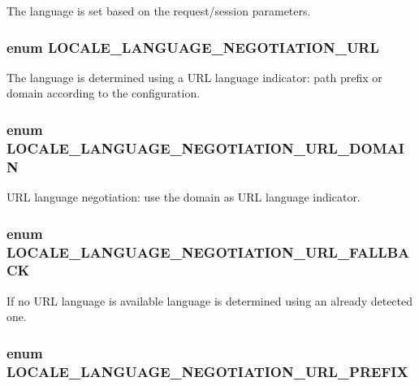 \label{locale_8inc_a332fbf28d5c861b2960b5ae1376e6b1e}
The language is set based on the request/session parameters. \hypertarget{locale_8inc_a47663841cfe2ded810a1af260d33bcef}{
\subsubsection[{LOCALE\_\-LANGUAGE\_\-NEGOTIATION\_\-URL}]{\setlength{\rightskip}{0pt plus 5cm}enum {\bf LOCALE\_\-LANGUAGE\_\-NEGOTIATION\_\-URL}}}
\label{locale_8inc_a47663841cfe2ded810a1af260d33bcef}
The language is determined using a URL language indicator: path prefix or domain according to the configuration. \hypertarget{locale_8inc_ac815dab3f6c2244543e6c87b3c78b722}{
\subsubsection[{LOCALE\_\-LANGUAGE\_\-NEGOTIATION\_\-URL\_\-DOMAIN}]{\setlength{\rightskip}{0pt plus 5cm}enum {\bf LOCALE\_\-LANGUAGE\_\-NEGOTIATION\_\-URL\_\-DOMAIN}}}
\label{locale_8inc_ac815dab3f6c2244543e6c87b3c78b722}
URL language negotiation: use the domain as URL language indicator. \hypertarget{locale_8inc_ac11524aa19a628190254ea1505ccc87b}{
\subsubsection[{LOCALE\_\-LANGUAGE\_\-NEGOTIATION\_\-URL\_\-FALLBACK}]{\setlength{\rightskip}{0pt plus 5cm}enum {\bf LOCALE\_\-LANGUAGE\_\-NEGOTIATION\_\-URL\_\-FALLBACK}}}
\label{locale_8inc_ac11524aa19a628190254ea1505ccc87b}
If no URL language is available language is determined using an already detected one. \hypertarget{locale_8inc_a850c602237657f7df487f9d1dfe951df}{
\subsubsection[{LOCALE\_\-LANGUAGE\_\-NEGOTIATION\_\-URL\_\-PREFIX}]{\setlength{\rightskip}{0pt plus 5cm}enum {\bf LOCALE\_\-LANGUAGE\_\-NEGOTIATION\_\-URL\_\-PREFIX}}}
